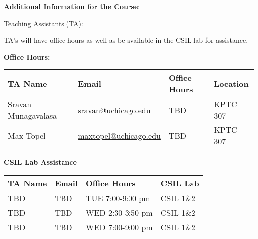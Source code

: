 \noindent \textbf {\Large \sc Additional Information for the Course}:

\vspace{1cm}

\noindent \underline{Teaching Assistants (TA):}

\noindent TA's will have office hours as well as be available in the CSIL lab for assistance.

\textbf{Office Hours:}

\begin{tabular}{l l | l | l }

TA Name & Email & Office Hours & Location \\ \hline

Sravan Munagavalasa & \href{mailto:sravan@uchicago.edu}{sravan@uchicago.edu}     & TBD  & KPTC 307 \\
Max Topel           & \href{mailto:maxtopel@uchicago.edu}{maxtopel@uchicago.edu} & TBD  & KPTC 307 \\


\end{tabular}

\vspace{1cm}

\textbf{CSIL Lab Assistance}

\begin{tabular}{l l | l | l }

TA Name & Email & Office Hours & CSIL Lab \\ \hline

TBD       & TBD     & TUE  7:00-9:00 pm  & CSIL 1\&2 \\
TBD       & TBD     & WED  2:30-3:50 pm  & CSIL 1\&2 \\
TBD       & TBD     & WED  7:00-9:00 pm  & CSIL 1\&2 \\


\end{tabular}

\vspace{1cm}

